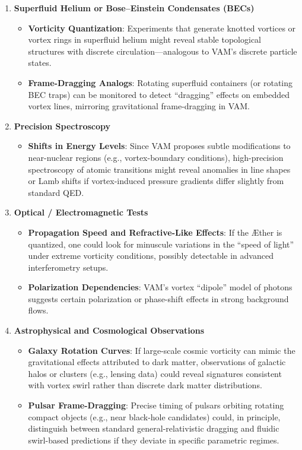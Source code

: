 \begin{enumerate}
    \item \textbf{Superfluid Helium or Bose–Einstein Condensates (BECs)}
    \begin{itemize}
        \item \textbf{Vorticity Quantization}: Experiments that generate knotted vortices or vortex rings in superfluid helium might reveal stable topological structures with discrete circulation—analogous to VAM’s discrete particle states.
        \item \textbf{Frame-Dragging Analogs}: Rotating superfluid containers (or rotating BEC traps) can be monitored to detect “dragging” effects on embedded vortex lines, mirroring gravitational frame-dragging in VAM.
    \end{itemize}

    \item \textbf{Precision Spectroscopy}
    \begin{itemize}
        \item \textbf{Shifts in Energy Levels}: Since VAM proposes subtle modifications to near-nuclear regions (e.g., vortex-boundary conditions), high-precision spectroscopy of atomic transitions might reveal anomalies in line shapes or Lamb shifts if vortex-induced pressure gradients differ slightly from standard QED.
    \end{itemize}

    \item \textbf{Optical / Electromagnetic Tests}
    \begin{itemize}
        \item \textbf{Propagation Speed and Refractive-Like Effects}: If the Æther is quantized, one could look for minuscule variations in the “speed of light” under extreme vorticity conditions, possibly detectable in advanced interferometry setups.
        \item \textbf{Polarization Dependencies}: VAM’s vortex “dipole” model of photons suggests certain polarization or phase-shift effects in strong background flows.
    \end{itemize}

    \item \textbf{Astrophysical and Cosmological Observations}
    \begin{itemize}
        \item \textbf{Galaxy Rotation Curves}: If large-scale cosmic vorticity can mimic the gravitational effects attributed to dark matter, observations of galactic halos or clusters (e.g., lensing data) could reveal signatures consistent with vortex swirl rather than discrete dark matter distributions.
        \item \textbf{Pulsar Frame-Dragging}: Precise timing of pulsars orbiting rotating compact objects (e.g., near black-hole candidates) could, in principle, distinguish between standard general-relativistic dragging and fluidic swirl-based predictions if they deviate in specific parametric regimes.
    \end{itemize}
\end{enumerate}

